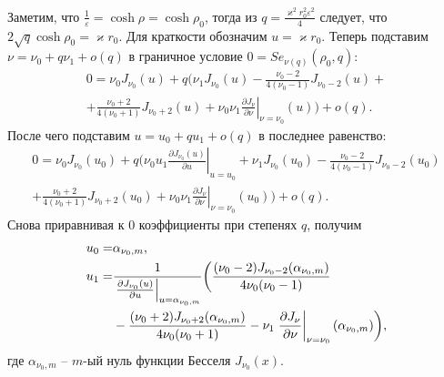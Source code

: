 Заметим, что $\frac{1}{\varepsilon} = \cosh \rho = \cosh \rho_0 $, тогда из  $q = \frac{\varkappa^2 r_0^2 \varepsilon^2}{4}$ следует, что $2\sqrt{q} \cosh{\rho_0} =   \varkappa r_0$. 
Для краткости обозначим $u = \varkappa r_0$. Теперь подставим  
$\nu=\nu_0 + q\nu_1 + o(q)$ в граничное условие $0 = Se_{\nu(q)}(\rho_0, q)$:
\begin{multline*}
0 = \nu_0 J_{\nu_0}(u) + q \bigl(  \nu_1 J_{\nu_0}(u) 
- \frac{\nu_0 - 2}{4(\nu_0-1)} J_{\nu_0-2}(u) + %
\\ %
+ \frac{\nu_0 + 2}{4(\nu_0+1)} J_{\nu_0+2}(u) +
 \nu_0 \nu_1 \left.\frac{\partial J_\nu}{\partial \nu}\right|_{\nu = \nu_0}(u)
\bigr) + o(q).
\end{multline*}
После чего подставим   $u = u_0 + q u_1 + o(q)$ в последнее равенство:
\begin{multline*}
0 = \nu_0 J_{\nu_0}(u_0) + q \bigl( 
\nu_0 u_1 \left.\frac{\partial J_{\nu_0}(u)}{\partial u}\right|_{u=u_0} 
+\nu_1 J_{\nu_0}(u_0) - \frac{\nu_0 - 2}{4(\nu_0-1)} J_{\nu_0-2}(u_0) \\ 
+\frac{\nu_0 + 2}{4(\nu_0+1)} J_{\nu_0+2}(u_0) 
+ \nu_0 \nu_1 \left.\frac{\partial J_\nu}{\partial \nu}\right|_{\nu = \nu_0}(u_0)
\bigr) + o(q).
\end{multline*}
Снова приравнивая к $0$ коэффициенты при степенях  $q$, получим
\begin{align}
    u_0 =& \alpha_{\nu_0, m}, \label{eq:u0}\\
    u_1 =& \frac{1}{\left.\frac{\partial J_{\nu_0}(u)}{\partial u}\right|_{u=\alpha_{\nu_0, m}} } \biggl(
\frac{(\nu_0 - 2)J_{\nu_0-2}(\alpha_{\nu_0, m}) }{4 \nu_0(\nu_0-1)} \notag \\    
&{}- \frac{(\nu_0 + 2)J_{\nu_0+2}(\alpha_{\nu_0, m}) }{4 \nu_0(\nu_0+1)} - \nu_1 \left.\frac{\partial J_\nu}{\partial \nu}\right|_{\nu = \nu_0}(\alpha_{\nu_0, m})
    \biggr),\label{eq:u1}
\end{align}
где $\alpha_{\nu_0, m}$ --  $m$-ый нуль функции Бесселя $J_{\nu_0}(x)$. 




